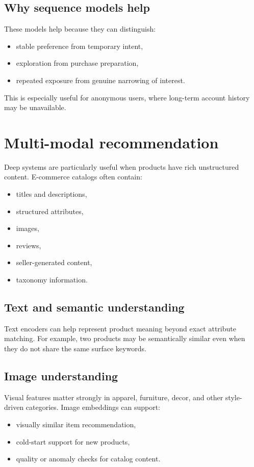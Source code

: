\subsection{Why sequence models help}
These models help because they can distinguish:
\begin{itemize}
  \item stable preference from temporary intent,
  \item exploration from purchase preparation,
  \item repeated exposure from genuine narrowing of interest.
\end{itemize}

This is especially useful for anonymous users, where long-term account history may be unavailable.

\section{Multi-modal recommendation}
Deep systems are particularly useful when products have rich unstructured content.
E-commerce catalogs often contain:
\begin{itemize}
  \item titles and descriptions,
  \item structured attributes,
  \item images,
  \item reviews,
  \item seller-generated content,
  \item taxonomy information.
\end{itemize}

\subsection{Text and semantic understanding}
Text encoders can help represent product meaning beyond exact attribute matching.
For example, two products may be semantically similar even when they do not share the same surface keywords.

\subsection{Image understanding}
Visual features matter strongly in apparel, furniture, decor, and other style-driven categories.
Image embeddings can support:
\begin{itemize}
  \item visually similar item recommendation,
  \item cold-start support for new products,
  \item quality or anomaly checks for catalog content.
\end{itemize}

